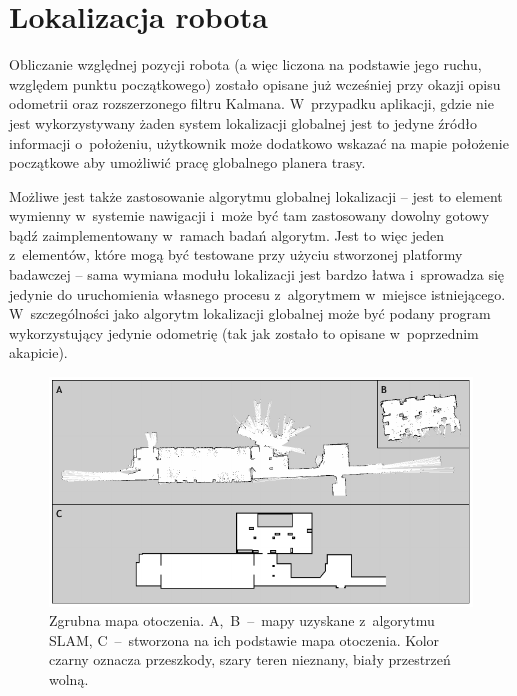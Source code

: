 \section{Lokalizacja robota}

Obliczanie względnej pozycji robota (a więc liczona na podstawie jego ruchu, względem
punktu początkowego) zostało opisane już wcześniej przy okazji opisu odometrii
oraz rozszerzonego filtru Kalmana. W~przypadku aplikacji, gdzie nie jest wykorzystywany
żaden system lokalizacji globalnej jest to jedyne źródło informacji o~położeniu,
użytkownik może dodatkowo wskazać na mapie położenie początkowe aby umożliwić pracę
globalnego planera trasy.

Możliwe jest także zastosowanie algorytmu globalnej lokalizacji -- jest to element
wymienny w~systemie nawigacji i~może być tam zastosowany dowolny gotowy bądź zaimplementowany
w~ramach badań algorytm. Jest to więc jeden z~elementów, które mogą być testowane
przy użyciu stworzonej platformy badawczej -- sama wymiana modułu lokalizacji jest
bardzo łatwa i~sprowadza się jedynie do uruchomienia własnego procesu z~algorytmem
w~miejsce istniejącego. W~szczególności jako algorytm lokalizacji globalnej może być
podany program wykorzystujący jedynie odometrię (tak jak zostało to opisane w~poprzednim
akapicie).

\begin{figure}[htb!]
\centering
\includegraphics[width=15cm]{../../Common/img/maps}
\caption[Mapa otoczenia]{Zgrubna mapa otoczenia. A,~B~--~mapy uzyskane z~algorytmu SLAM,
C~--~stworzona na ich podstawie mapa otoczenia. Kolor czarny oznacza przeszkody, szary teren
nieznany, biały przestrzeń wolną.}
\label{fig:maps}
\end{figure}

